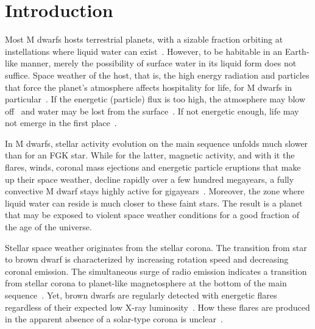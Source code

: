 \documentclass[twocolumn]{aastex631}
\begin{document}
\section{Introduction}
\label{sec:intro}
Most M dwarfs hosts terrestrial planets, with a sizable fraction orbiting at instellations where liquid water can exist~\citep{dressing2015occurrence, hardegree-ullman2019kepler, ment2023occurrence}. However, to be habitable in an Earth-like manner, merely the possibility of surface water in its liquid form does not suffice. Space weather of the host, that is, the high energy radiation and particles that force the planet's atmosphere affects hospitality for life, for M dwarfs in particular~\citep{airapetian2020impact}. If the energetic (particle) flux is too high, the atmosphere may blow off~\citep[e.g., ][]{lammer2003atmospheric, garraffo2017threatening, ketzer2022influence} and water may be lost from the surface~\citep{doamaral2022contribution}. If not energetic enough, life may not emerge in the first place~\citep{rimmer2018origin}.

In M dwarfs, stellar activity evolution on the main sequence unfolds much slower than for an FGK star. While for the latter, magnetic activity, and with it the flares, winds, coronal mass ejections and energetic particle eruptions that make up their space weather, decline rapidly over a few hundred megayears, a fully convective M dwarf stays highly active for gigayears~\citep{johnstone2021active, medina2022galactic}. Moreover, the zone where liquid water can reside is much closer to these faint stars. The result is a planet that may be exposed to violent space weather conditions for a good fraction of the age of the universe. 

Stellar space weather originates from the stellar corona. The transition from star to brown dwarf is characterized by increasing rotation speed and decreasing coronal emission. The simultaneous surge of radio emission indicates a transition from stellar corona to planet-like magnetosphere at the bottom of the main sequence~\citep{zarka1998auroral,pineda2017panchromatic}. Yet, brown dwarfs are regularly detected with energetic flares regardless of their expected low X-ray luminosity~\citep[e.g., ][]{hambaryan2004new, gizis2013kepler, paudel2020k2, schmidt2019largest}. How these flares are produced in the apparent absence of a solar-type corona is unclear~\citep{mullan2018frequencies}.%
\end{document}
